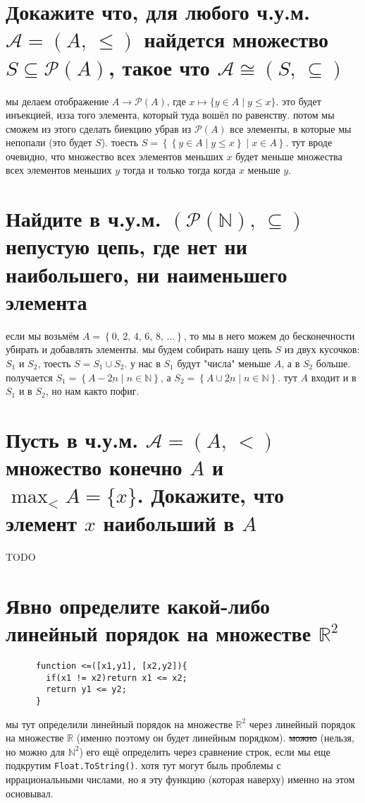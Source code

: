 \documentclass{article}
\newcommand{\N}{\mathbb{N}}
\newcommand{\R}{\mathbb{R}}
\newcommand{\range}{\underline}
\newcommand{\pe}[2]{({#1},\, {#2})}
\renewcommand{\l}{\left}
\renewcommand{\r}{\right}
\renewcommand{\P}[1]{\mathcal{P}\l(#1\r)}
\begin{document}
  \section{Докажите что, для любого ч.у.м. $\mathcal{A} = \pe{A}{\leq}$ найдется множество $S \subseteq \P{A}$, такое что $\mathcal{A} \cong \pe{S}{\subseteq}$}
  мы делаем отображение $A \to \P{A}$, где $x \mapsto \{y \in A \mid y \leq x\}$.
  это будет инъекцией, изза того элемента, который туда вошёл по равенству.
  потом мы сможем из этого сделать биекцию убрав из $\P{A}$ все элементы, в которые мы непопали (это будет $S$).
  тоесть $S = \l\{\l\{y \in A \mid y \leq x\r\} \mid x \in A\r\}$.
  тут вроде очевидно, что множество всех элементов меньших $x$ будет меньше множества всех элементов меньших $y$ тогда и только тогда когда $x$ меньше $y$.

  \section{Найдите в ч.у.м. $\pe{\P{\N}}{\subseteq}$ непустую цепь, где нет ни наибольшего, ни наименьшего элемента}
  если мы возьмём $A = \l\{0,\, 2,\, 4,\, 6,\, 8,\, \dots \r\}$, то мы в него можем до бесконечности убирать и добавлять элементы.
  мы будем собирать нашу цепь $S$ из двух кусочков: $S_1$ и $S_2$, тоесть $S = S_1 \cup S_2$.
  у нас в $S_1$ будут "{}числа"{} меньше $A$, а в $S_2$ больше.
  получается $S_1 = \l\{ A - \range{2n} \mid n \in \N \r\}$,
  а $S_2 = \l\{ A \cup \range{2n} \mid n \in \N \r\}$.
  тут $A$ входит и в $S_1$ и в $S_2$, но нам както пофиг.

  \section{Пусть в ч.у.м. $\mathcal{A} = \pe{A}{<}$ множество конечно $A$ и $\max_< A = \{x\}$. Докажите, что элемент $x$ наибольший в $A$}
  TODO

  \section{Явно определите какой-либо линейный порядок на множестве $\R^2$}
  \begin{center}
    \begin{BVerbatim}
      function <=([x1,y1], [x2,y2]){
        if(x1 != x2)return x1 <= x2;
        return y1 <= y2;
      }
    \end{BVerbatim}
  \end{center}
  мы тут определили линейный порядок на множестве $\R^2$ через линейный порядок на множестве $\R$ (именно поэтому он будет линейным порядком).
  \sout{можно} (нельзя, но можно для $\N^2$) его ещё определить через сравнение строк, если мы еще подкрутим \texttt{Float.ToString()}.
  хотя тут могут быль проблемы с иррациональными числами, но я эту функцию (которая наверху) именно на этом основывал.
\end{document}
